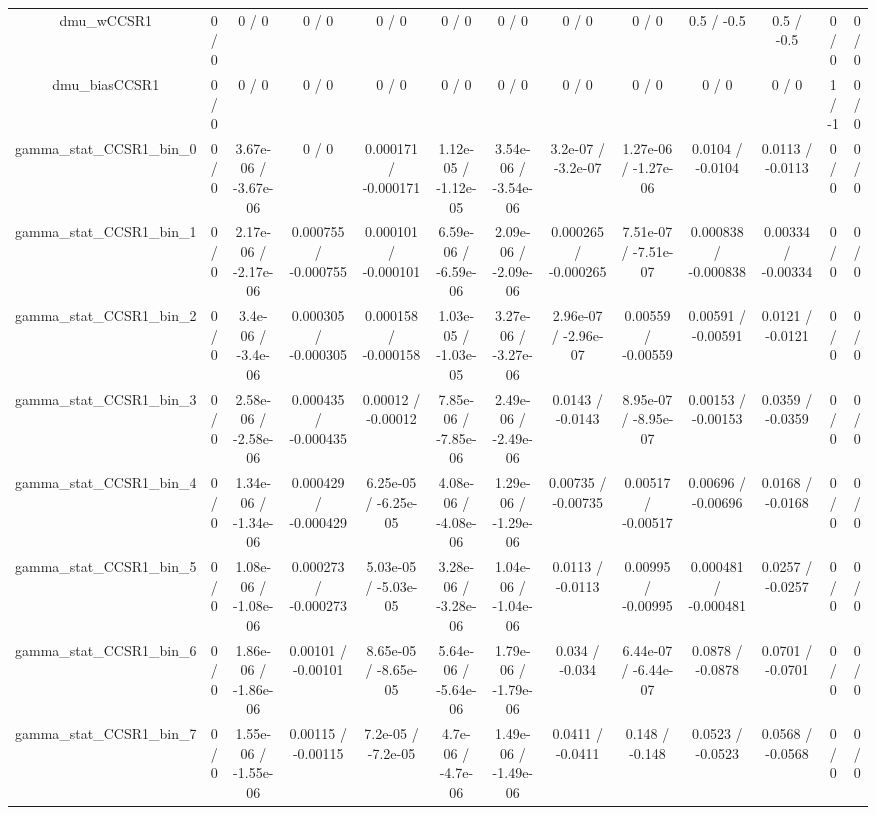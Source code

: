 \documentclass[10pt]{article}
\begin{document}
\begin{table}[htbp]
\begin{center}
\begin{tabular}{|c|c|c|c|c|c|c|c|c|c|c|c|c|}
  dmu_wCCSR1 & 0 / 0 & 0 / 0 & 0 / 0 & 0 / 0 & 0 / 0 & 0 / 0 & 0 / 0 & 0 / 0 & 0.5 / -0.5 & 0.5 / -0.5 & 0 / 0 & 0 / 0 \\ 
  dmu_biasCCSR1 & 0 / 0 & 0 / 0 & 0 / 0 & 0 / 0 & 0 / 0 & 0 / 0 & 0 / 0 & 0 / 0 & 0 / 0 & 0 / 0 & 1 / -1 & 0 / 0 \\ 
  gamma_stat_CCSR1_bin_0 & 0 / 0 & 3.67e-06 / -3.67e-06 & 0 / 0 & 0.000171 / -0.000171 & 1.12e-05 / -1.12e-05 & 3.54e-06 / -3.54e-06 & 3.2e-07 / -3.2e-07 & 1.27e-06 / -1.27e-06 & 0.0104 / -0.0104 & 0.0113 / -0.0113 & 0 / 0 & 0 / 0 \\ 
  gamma_stat_CCSR1_bin_1 & 0 / 0 & 2.17e-06 / -2.17e-06 & 0.000755 / -0.000755 & 0.000101 / -0.000101 & 6.59e-06 / -6.59e-06 & 2.09e-06 / -2.09e-06 & 0.000265 / -0.000265 & 7.51e-07 / -7.51e-07 & 0.000838 / -0.000838 & 0.00334 / -0.00334 & 0 / 0 & 0 / 0 \\ 
  gamma_stat_CCSR1_bin_2 & 0 / 0 & 3.4e-06 / -3.4e-06 & 0.000305 / -0.000305 & 0.000158 / -0.000158 & 1.03e-05 / -1.03e-05 & 3.27e-06 / -3.27e-06 & 2.96e-07 / -2.96e-07 & 0.00559 / -0.00559 & 0.00591 / -0.00591 & 0.0121 / -0.0121 & 0 / 0 & 0 / 0 \\ 
  gamma_stat_CCSR1_bin_3 & 0 / 0 & 2.58e-06 / -2.58e-06 & 0.000435 / -0.000435 & 0.00012 / -0.00012 & 7.85e-06 / -7.85e-06 & 2.49e-06 / -2.49e-06 & 0.0143 / -0.0143 & 8.95e-07 / -8.95e-07 & 0.00153 / -0.00153 & 0.0359 / -0.0359 & 0 / 0 & 0 / 0 \\ 
  gamma_stat_CCSR1_bin_4 & 0 / 0 & 1.34e-06 / -1.34e-06 & 0.000429 / -0.000429 & 6.25e-05 / -6.25e-05 & 4.08e-06 / -4.08e-06 & 1.29e-06 / -1.29e-06 & 0.00735 / -0.00735 & 0.00517 / -0.00517 & 0.00696 / -0.00696 & 0.0168 / -0.0168 & 0 / 0 & 0 / 0 \\ 
  gamma_stat_CCSR1_bin_5 & 0 / 0 & 1.08e-06 / -1.08e-06 & 0.000273 / -0.000273 & 5.03e-05 / -5.03e-05 & 3.28e-06 / -3.28e-06 & 1.04e-06 / -1.04e-06 & 0.0113 / -0.0113 & 0.00995 / -0.00995 & 0.000481 / -0.000481 & 0.0257 / -0.0257 & 0 / 0 & 0 / 0 \\ 
  gamma_stat_CCSR1_bin_6 & 0 / 0 & 1.86e-06 / -1.86e-06 & 0.00101 / -0.00101 & 8.65e-05 / -8.65e-05 & 5.64e-06 / -5.64e-06 & 1.79e-06 / -1.79e-06 & 0.034 / -0.034 & 6.44e-07 / -6.44e-07 & 0.0878 / -0.0878 & 0.0701 / -0.0701 & 0 / 0 & 0 / 0 \\ 
  gamma_stat_CCSR1_bin_7 & 0 / 0 & 1.55e-06 / -1.55e-06 & 0.00115 / -0.00115 & 7.2e-05 / -7.2e-05 & 4.7e-06 / -4.7e-06 & 1.49e-06 / -1.49e-06 & 0.0411 / -0.0411 & 0.148 / -0.148 & 0.0523 / -0.0523 & 0.0568 / -0.0568 & 0 / 0 & 0 / 0 \\ 

\end{tabular}
\end{center}
\end{table}
\end{document}
